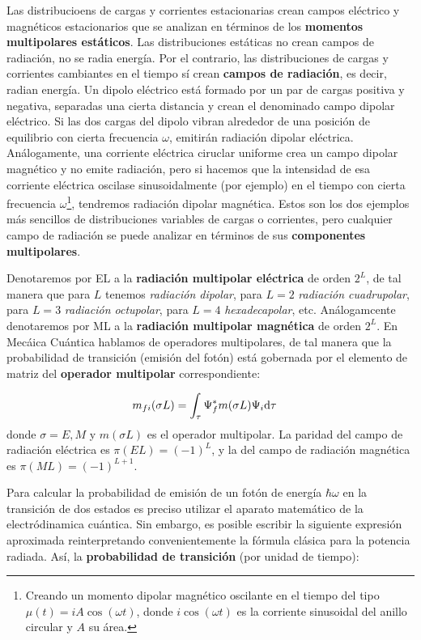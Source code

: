 Las distribucioens de cargas y corrientes estacionarias crean campos eléctrico y magnéticos estacionarios que se analizan en términos de los \textbf{momentos multipolares estáticos}. Las distribuciones estáticas no crean campos de radiación, no se radia energía. Por el contrario, las distribuciones de cargas y corrientes cambiantes en el  tiempo sí crean \textbf{campos de radiación}, es decir, radian energía. Un dipolo eléctrico está formado por un par de cargas positiva y negativa, separadas una cierta distancia y crean el denominado campo dipolar eléctrico. Si las dos cargas del dipolo vibran alrededor de una posición de equilibrio con cierta frecuencia $\omega$, emitirán radiación dipolar eléctrica. Análogamente, una corriente eléctrica ciruclar uniforme crea un campo dipolar magnético y no emite radiación, pero si hacemos que la intensidad de esa corriente eléctrica oscilase sinusoidalmente (por ejemplo) en el tiempo con cierta frecuencia $\omega$\footnote{Creando un momento dipolar magnético oscilante en el tiempo del tipo $\mu(t)=iA\cos (\omega t)$, donde $i\cos (\omega t)$ es la corriente sinusoidal del anillo circular y $A$ su área.}, tendremos radiación dipolar magnética. Estos son los dos ejemplos más sencillos de distribuciones variables de cargas o corrientes, pero cualquier campo de radiación se puede analizar en términos de sus \textbf{componentes multipolares}. 

Denotaremos por EL a la \textbf{radiación multipolar eléctrica} de orden $2^L$, de tal manera que para $L$ tenemos \textit{radiación dipolar}, para $L=2$ \textit{radiación cuadrupolar}, para $L=3$ \textit{radiación octupolar}, para $L=4$ \textit{hexadecapolar}, etc. Análogamcente denotaremos por ML a la \textbf{radiación multipolar magnética} de orden $2^L$. En Mecáica Cuántica hablamos de operadores multipolares, de tal manera que la probabilidad de transición (emisión del fotón) está gobernada por el elemento de matriz del \textbf{operador multipolar} correspondiente:

\begin{equation}
	m_{fi} (\sigma L) = \int_\tau \Psi_f^* m(\sigma L) \Psi_i \mathrm{d} \tau \quad
\end{equation}
donde $\sigma=E,M$  y $m(\sigma L)$ es el operador multipolar. La paridad del campo de radiación eléctrica es $\pi(EL)=(-1)^L$, y la del campo de radiación magnética es $\pi(ML)=(-1)^{L+1}$.


Para calcular la probabilidad de emisión de un fotón de energía $\hbar \omega$ en la transición de dos estados es preciso utilizar el aparato matemático de la electródinamica cuántica. Sin embargo, es posible escribir la siguiente expresión aproximada reinterpretando convenientemente la fórmula clásica para la potencia radiada. Así, la \textbf{probabilidad de transición} (por unidad de tiempo):

